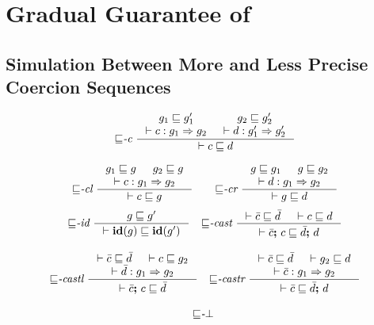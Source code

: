 \chapter{Gradual Guarantee of \Surface}
\label{ch:gg}

\section{Simulation Between More and Less Precise Coercion Sequences}
\label{sec:sim-cexpr}

\begin{figure}[tbp]
\raggedright
  {\small
  \begin{gather*}
    {\sqsubseteq}\textit{-c} ~
    \inference{g_1 \sqsubseteq g_1' & g_2 \sqsubseteq g_2' \\ \vdash c : g_1 \Rightarrow g_2 & \vdash d : g_1' \Rightarrow g_2'}
              {\vdash c \sqsubseteq d}
    \\[2ex]
    {\sqsubseteq}\textit{-cl} ~
    \inference{g_1 \sqsubseteq g & g_2 \sqsubseteq g \\ \vdash c : g_1 \Rightarrow g_2}
              {\vdash c \sqsubseteq g}
    \qquad
    {\sqsubseteq}\textit{-cr} ~
    \inference{g \sqsubseteq g_1 & g \sqsubseteq g_2 \\ \vdash d : g_1 \Rightarrow g_2}
              {\vdash g \sqsubseteq d}
  \end{gather*}}
  {\small
  \begin{gather*}
    {\sqsubseteq}\textit{-id} ~
    \inference{g \sqsubseteq g'}
              {\vdash \id{g} \sqsubseteq \id{g'}}
    \quad
    {\sqsubseteq}\textit{-cast} ~
    \inference{\vdash \bar{c} \sqsubseteq \bar{d} & \vdash c \sqsubseteq d}
              {\vdash \bar{c} \seq c \sqsubseteq \bar{d} \seq d}
    \\[2ex]
    {\sqsubseteq}\textit{-castl} ~
    \inference{\vdash \bar{c} \sqsubseteq \bar{d} & \vdash c \sqsubseteq g_2 \\ \vdash \bar{d} : g_1 \Rightarrow g_2}
              {\vdash \bar{c} \seq c \sqsubseteq \bar{d}}
    \quad
    {\sqsubseteq}\textit{-castr} ~
    \inference{\vdash \bar{c} \sqsubseteq \bar{d} & \vdash g_2 \sqsubseteq d \\ \vdash \bar{c} : g_1 \Rightarrow g_2}
              {\vdash \bar{c} \sqsubseteq \bar{d} \seq d}
    \\[2ex]
    {\sqsubseteq}\textit{-}\bot ~

\end{gather*}}
\end{figure}
